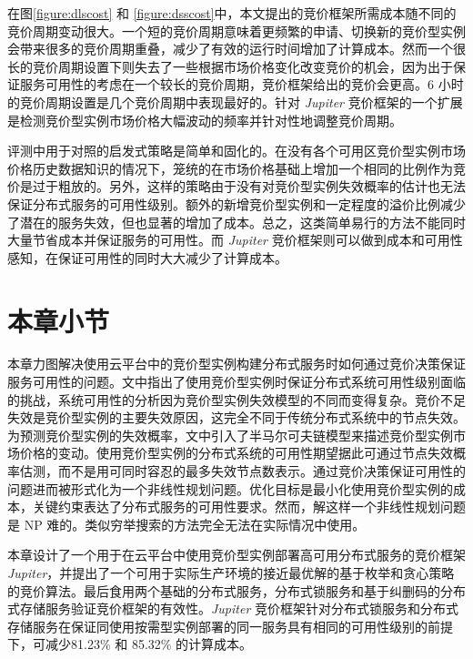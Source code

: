 在图\ref{figure:dlscost} 和 \ref{figure:dsscost}中，本文提出的竞价框架所需成本随不同的竞价周期变动很大。一个短的竞价周期意味着更频繁的申请、切换新的竞价型实例会带来很多的竞价周期重叠，减少了有效的运行时间增加了计算成本。然而一个很长的竞价周期设置下则失去了一些根据市场价格变化改变竞价的机会，因为出于保证服务可用性的考虑在一个较长的竞价周期，竞价框架给出的竞价会更高。6 小时的竞价周期设置是几个竞价周期中表现最好的。针对 \emph{Jupiter} 竞价框架的一个扩展是检测竞价型实例市场价格大幅波动的频率并针对性地调整竞价周期。

评测中用于对照的启发式策略是简单和固化的。在没有各个可用区竞价型实例市场价格历史数据知识的情况下，笼统的在市场价格基础上增加一个相同的比例作为竞价是过于粗放的。另外，这样的策略由于没有对竞价型实例失效概率的估计也无法保证分布式服务的可用性级别。额外的新增竞价型实例和一定程度的溢价比例减少了潜在的服务失效，但也显著的增加了成本。总之，这类简单易行的方法不能同时大量节省成本并保证服务的可用性。而 \emph{Jupiter} 竞价框架则可以做到成本和可用性感知，在保证可用性的同时大大减少了计算成本。

\section{本章小节}
\label{sec:jupiter-conclusion}
本章力图解决使用云平台中的竞价型实例构建分布式服务时如何通过竞价决策保证服务可用性的问题。文中指出了使用竞价型实例时保证分布式系统可用性级别面临的挑战，系统可用性的分析因为竞价型实例失效模型的不同而变得复杂。竞价不足失效是竞价型实例的主要失效原因，这完全不同于传统分布式系统中的节点失效。为预测竞价型实例的失效概率，文中引入了半马尔可夫链模型来描述竞价型实例市场价格的变动。使用竞价型实例的分布式系统的可用性期望据此可通过节点失效概率估测，而不是用可同时容忍的最多失效节点数表示。通过竞价决策保证可用性的问题进而被形式化为一个非线性规划问题。优化目标是最小化使用竞价型实例的成本，关键约束表达了分布式服务的可用性要求。然而，解这样一个非线性规划问题是 NP 难的。类似穷举搜索的方法完全无法在实际情况中使用。

本章设计了一个用于在云平台中使用竞价型实例部署高可用分布式服务的竞价框架 \emph{Jupiter}，并提出了一个可用于实际生产环境的接近最优解的基于枚举和贪心策略的竞价算法。最后食用两个基础的分布式服务，分布式锁服务和基于纠删码的分布式存储服务验证竞价框架的有效性。\emph{Jupiter} 竞价框架针对分布式锁服务和分布式存储服务在保证同使用按需型实例部署的同一服务具有相同的可用性级别的前提下，可减少81.23\% 和 85.32\% 的计算成本。
